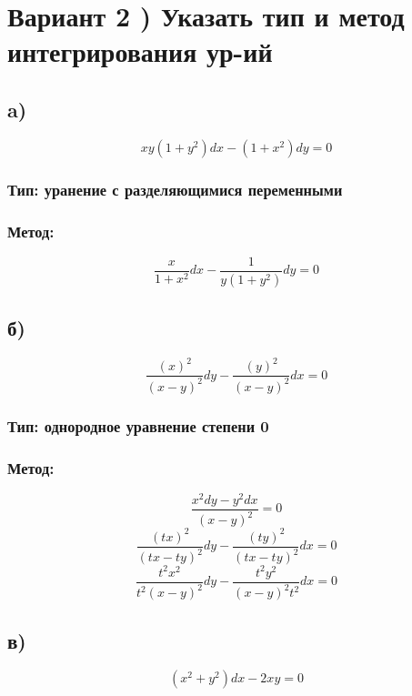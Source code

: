 \documentclass[a4paper]{article}
\begin{document}
\section*{Вариант 2 ) Указать тип и метод интегрирования ур-ий}
\subsection*{a)}
\begin{equation*}
xy(1 + y^2)dx - (1 + x^2)dy = 0
\end{equation*}
\subsubsection*{Тип: уранение с разделяющимися переменными}

\subsubsection*{Метод:}
\begin{equation*}
\frac{x}{1 + x^2}dx - \frac{1}{y(1+y^2)}dy = 0
\end{equation*}

\subsection*{б)}
\begin{equation*}
\frac{(x)^2}{(x - y)^2}dy - \frac{(y)^2}{(x - y)^2}dx = 0
\end{equation*}
\subsubsection*{Тип: однородное уравнение степени 0}

\subsubsection*{Метод:}
\begin{equation*}
\frac{x^2dy - y^2dx}{(x - y)^2} = 0
\end{equation*}
\begin{equation*}
\frac{(tx)^2}{(tx - ty)^2}dy - \frac{(ty)^2}{(tx - ty)^2}dx = 0
\end{equation*}
\begin{equation*}
\frac{t^2x^2}{t^2(x - y)^2}dy - \frac{t^2y^2}{(x - y)^2t^2}dx = 0
\end{equation*}

\subsection*{в)}
\begin{equation*}
(x^2+ y^2)dx - 2xy = 0
\end{equation*}
\end{document}

